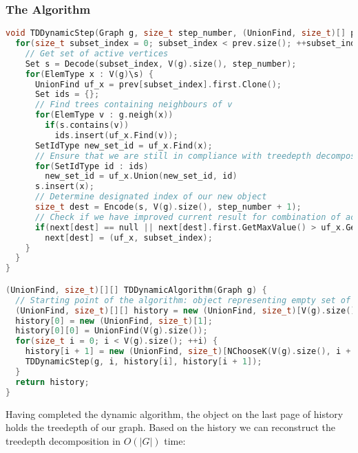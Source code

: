 \subsubsection{The Algorithm}
\begin{lstlisting}[language=C++]
void TDDynamicStep(Graph g, size_t step_number, (UnionFind, size_t)[] prev, (UnionFind, size_t)[] next) {
  for(size_t subset_index = 0; subset_index < prev.size(); ++subset_index) {
    // Get set of active vertices
    Set s = Decode(subset_index, V(g).size(), step_number);
    for(ElemType x : V(g)\s) {
      UnionFind uf_x = prev[subset_index].first.Clone();
      Set ids = {};
      // Find trees containing neighbours of v
      for(ElemType v : g.neigh(x))
        if(s.contains(v))
          ids.insert(uf_x.Find(v));
      SetIdType new_set_id = uf_x.Find(x);
      // Ensure that we are still in compliance with treedepth decomposition definition when adding x to active vertices
      for(SetIdType id : ids)
        new_set_id = uf_x.Union(new_set_id, id)
      s.insert(x);
      // Determine designated index of our new object
      size_t dest = Encode(s, V(g).size(), step_number + 1);
      // Check if we have improved current result for combination of active vertices represented by s
      if(next[dest] == null || next[dest].first.GetMaxValue() > uf_x.GetMaxValue())
        next[dest] = (uf_x, subset_index);
    }
  }
}

(UnionFind, size_t)[][] TDDynamicAlgorithm(Graph g) {
  // Starting point of the algorithm: object representing empty set of active vertices
  (UnionFind, size_t)[][] history = new (UnionFind, size_t)[V(g).size()][];
  history[0] = new (UnionFind, size_t)[1];
  history[0][0] = UnionFind(V(g).size());
  for(size_t i = 0; i < V(g).size(); ++i) {
    history[i + 1] = new (UnionFind, size_t)[NChooseK(V(g).size(), i + 1)];
    TDDynamicStep(g, i, history[i], history[i + 1]);
  }
  return history;
}
\end{lstlisting}
Having completed the dynamic algorithm, the object on the last page of history holds the treedepth of our graph. Based on the history we can reconstruct the treedepth decomposition in $O(|G|)$ time:
